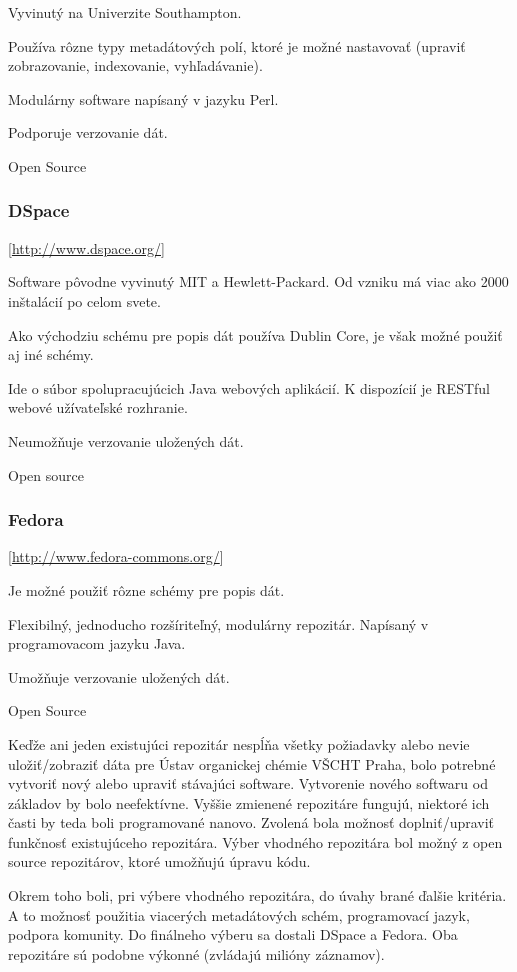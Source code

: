 \documentclass[thesis=M,slovak]{FITthesis}[2013/05/06]
\begin{document}
Vyvinutý na Univerzite Southampton.

Používa rôzne typy metadátových polí, ktoré je možné nastavovať (upraviť zobrazovanie, indexovanie, vyhľadávanie).

Modulárny software napísaný v jazyku Perl.

Podporuje verzovanie dát.

Open Source

\subsubsection {DSpace} [\url{http://www.dspace.org/}]

Software pôvodne vyvinutý MIT a Hewlett-Packard. Od vzniku má viac ako 2000 inštalácií po celom svete. 

Ako východziu schému pre popis dát používa Dublin Core, je však možné použiť aj iné schémy.

Ide o súbor spolupracujúcich Java webových aplikácií. K dispozícií je RESTful webové užívateľské rozhranie.

Neumožňuje verzovanie uložených dát.

Open source

\subsubsection {Fedora} [\url{http://www.fedora-commons.org/}]

Je možné použiť rôzne schémy pre popis dát.

Flexibilný, jednoducho rozšíriteľný, modulárny repozitár. Napísaný v programovacom jazyku Java.

Umožňuje verzovanie uložených dát.

Open Source

\quad

Keďže ani jeden existujúci repozitár nespĺňa všetky požiadavky alebo nevie uložiť/zobraziť dáta pre Ústav organickej chémie VŠCHT Praha, bolo potrebné vytvoriť nový alebo upraviť stávajúci software. Vytvorenie nového softwaru od základov by bolo neefektívne. Vyššie zmienené repozitáre fungujú, niektoré ich časti by teda boli programované nanovo. Zvolená bola možnosť doplniť/upraviť funkčnosť existujúceho repozitára. Výber vhodného repozitára bol možný z open source repozitárov, ktoré umožňujú úpravu kódu.

Okrem toho boli, pri výbere vhodného repozitára, do úvahy brané ďalšie kritéria. A to možnosť použitia viacerých metadátových schém, programovací jazyk, podpora komunity. Do finálneho výberu sa dostali DSpace a Fedora. Oba repozitáre sú podobne výkonné (zvládajú milióny záznamov).
\end{document}
